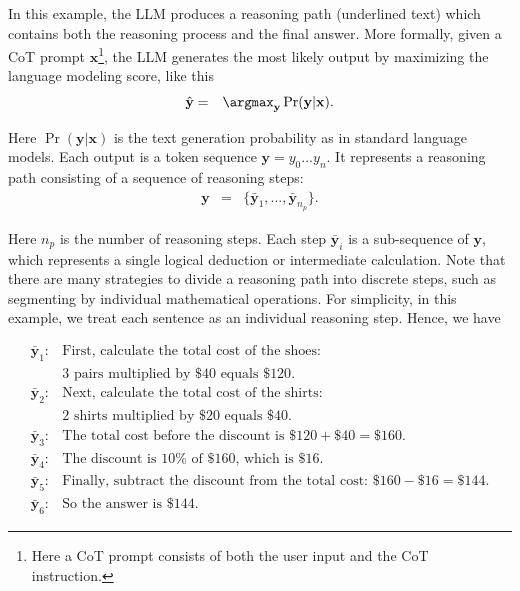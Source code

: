 In this example, the LLM produces a reasoning path (underlined text) which contains both the reasoning process and the final answer. More formally, given a CoT prompt $\mathbf{x}$\footnote{Here a CoT prompt consists of both the user input and the CoT instruction.}, the LLM generates the most likely output by maximizing the language modeling score, like this
\begin{eqnarray}
\hat{\mathbf{y}} & = & \argmax_{\mathbf{y}} \Pr(\mathbf{y} | \mathbf{x}).
\end{eqnarray}

\noindent Here $\Pr(\mathbf{y} | \mathbf{x})$ is the text generation probability as in standard language models. Each output is a token sequence $\mathbf{y}=y_0...y_n$. It represents a reasoning path consisting of a sequence of reasoning steps:
\begin{eqnarray}
\mathbf{y} & = & \{\bar{\mathbf{y}}_1,...,\bar{\mathbf{y}}_{n_p}\}. \label{eq:reasoning-path-notation}
\end{eqnarray}

\noindent Here $n_p$ is the number of reasoning steps. Each step $\bar{\mathbf{y}}_i$ is a sub-sequence of $\mathbf{y}$, which represents a single logical deduction or intermediate calculation. Note that there are many strategies to divide a reasoning path into discrete steps, such as segmenting by individual mathematical operations. For simplicity, in this example, we treat each sentence as an individual reasoning step. Hence, we have

\[
\begin{array}{rl}
\bar{\mathbf{y}}_1: & \text{First, calculate the total cost of the shoes: }\nonumber \\
& \text{$3$ pairs multiplied by $\$40$ equals $\$120$.} \nonumber \\
\bar{\mathbf{y}}_2: & \text{Next, calculate the total cost of the shirts: } \nonumber \\
& \text{$2$ shirts multiplied by $\$20$ equals $\$40$.} \nonumber \\
\bar{\mathbf{y}}_3: & \text{The total cost before the discount is $\$120 + \$40 = \$160$.} \nonumber \\
\bar{\mathbf{y}}_4: & \text{The discount is $10\%$ of $\$160$, which is $\$16$.} \nonumber \\
\bar{\mathbf{y}}_5: & \text{Finally, subtract the discount from the total cost: $\$160 - \$16 = \$144$.} \nonumber \\
\bar{\mathbf{y}}_6: & \text{So the answer is $\$144$.} \nonumber
\end{array}
\]

